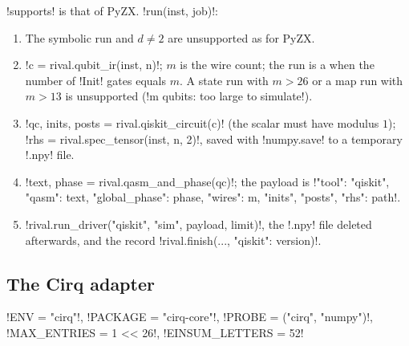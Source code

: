 \py!supports! is that of PyZX. \py!run(inst, job)!:
\begin{enumerate}
\item The symbolic run and $d\neq2$ are unsupported as for PyZX.
\item \py!c = rival.qubit_ir(inst, n)!; $m$ is the wire count; the run is a  when the number of \py!Init! gates equals $m$. A state run with $m>26$ or a map run with $m>13$ is unsupported (\code!m qubits: too large to simulate!).
\item \py!qc, inits, posts = rival.qiskit_circuit(c)! (the scalar must have modulus $1$); \py!rhs = rival.spec_tensor(inst, n, 2)!, saved with \py!numpy.save! to a temporary \code!.npy! file.
\item \py!text, phase = rival.qasm_and_phase(qc)!; the payload is \py!{"tool": "qiskit", "qasm": text, "global_phase": phase, "wires": m, "inits", "posts", "rhs": path}!.
\item \py!rival.run_driver("qiskit", "sim", payload, limit)!, the \code!.npy! file deleted afterwards, and the record \py!rival.finish(..., {"qiskit": version})!.
\end{enumerate}

\subsection{The Cirq adapter}

\begin{signature}
\py!ENV = "cirq"!, \py!PACKAGE = "cirq-core"!, \py!PROBE = ("cirq", "numpy")!,\\
\py!MAX_ENTRIES = 1 << 26!, \py!EINSUM_LETTERS = 52!
\end{signature}

